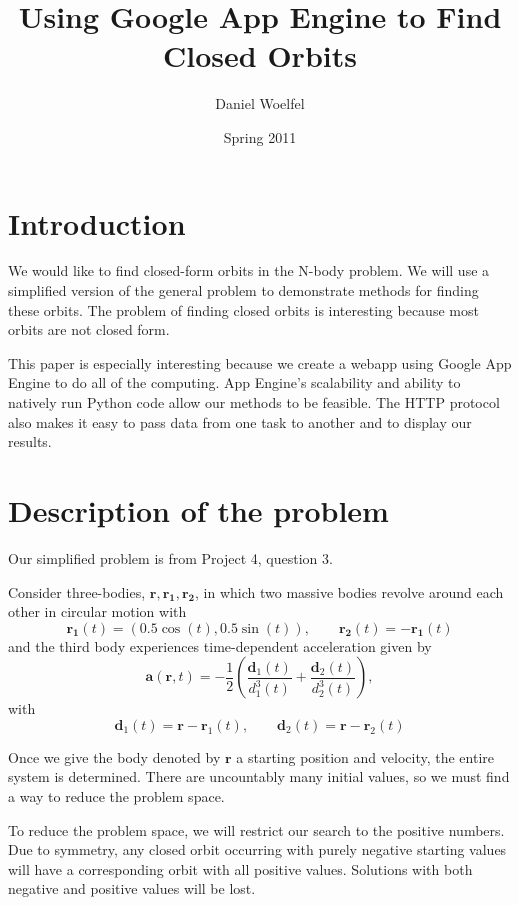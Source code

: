 \documentclass[11pt]{article}
\begin{document}
\title{Using Google App Engine to Find Closed Orbits}
\author{Daniel Woelfel}
\date{Spring 2011}
\maketitle

\section{Introduction}
We would like to find closed-form orbits in the N-body problem. We will use a simplified version of the general problem to demonstrate methods for finding these orbits. The problem of finding closed orbits is interesting because most orbits are not closed form. 

This paper is especially interesting because we create a webapp using Google App Engine to do all of the computing. App Engine's scalability and ability to natively run Python code allow our methods to be feasible. The HTTP protocol also makes it easy to pass data from one task to another and to display our results.



\section{Description of the problem}
Our simplified problem is from Project 4, question 3.

Consider three-bodies, $\mathbf{r}, \mathbf{r_1}, \mathbf{r_2}$, in which two massive bodies revolve around each other in circular motion with
\[ \mathbf{r_1}(t) = (0.5\cos(t), 0.5\sin(t)), \qquad \mathbf{r_2}(t) = -\mathbf{r_1}(t) \]
and the third body experiences time-dependent acceleration given by
\[ \mathbf{a}(\mathbf{r}, t) = -\frac{1}{2}\left(\frac{\mathbf{d}_1(t)}{d_1^3(t)} + \frac{\mathbf{d}_2(t)}{d_2^3(t)}\right), \]
with
\[ \mathbf{d}_1(t) = \mathbf{r} - \mathbf{r}_1(t), \qquad \mathbf{d}_2(t) = \mathbf{r} - \mathbf{r}_2(t) \]

Once we give the body denoted by $\mathbf{r}$ a starting position and velocity, the entire system is determined. There are uncountably many initial values, so we must find a way to reduce the problem space.

To reduce the problem space, we will restrict our search to the positive numbers. Due to symmetry, any closed orbit occurring with purely negative starting values will have a corresponding orbit with all positive values. Solutions with both negative and positive values will be lost.
\end{document}
